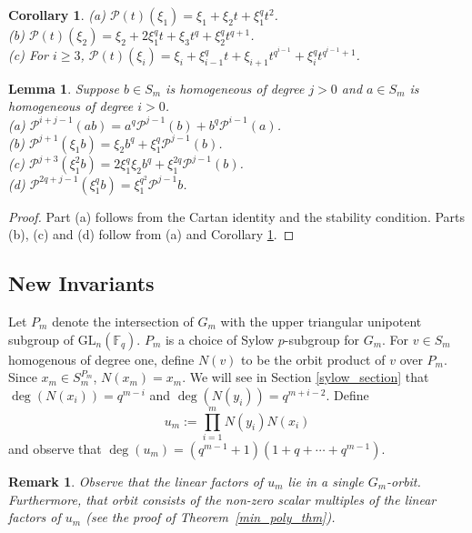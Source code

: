 \documentclass{amsart}
\newcommand{\field}{\mathbb{F}}
\newcommand{\gl}[2]{{{\text{GL}_{{#1}}(\field_{#2})}}}
\newcommand{\PP}{\mathcal{P}}
\newtheorem{lem}[subsection]{Lemma}
\newtheorem{cor}[subsection]{Corollary}
\newtheorem{remark}[subsection]{Remark}
\begin{document}
 \begin{cor} \label{com_st}(a) $\PP(t)(\xi_1)=\xi_1+\xi_2 t+\xi_1^q t^2$.\\
 (b) $\PP(t)(\xi_2)=\xi_2+2\xi_1^q t+\xi_3 t^q+\xi_2^q t^{q+1}$.\\
(c) For $i\geq 3$, 
 $\PP(t)(\xi_{i})=\xi_{i}+\xi_{i-1}^q t+\xi_{i+1} t^{q^{i-1}}+\xi_{i}^q t^{q^{i-1}+1}$.
 \end{cor}

\begin{lem} \label{sub_max} Suppose $b\in S_m$ is homogeneous of degree $j>0$ and $a\in S_m$ is homogeneous of degree $i>0$.\\
 (a) $\PP^{i+j-1}(ab)=a^q\PP^{j-1}(b)+b^q\PP^{i-1}(a)$.\\
 (b) $\PP^{j+1}(\xi_1b)=\xi_2b^q+\xi_1^q\PP^{j-1}(b)$.\\
 (c) $\PP^{j+3}(\xi_1^2b)=2\xi_1^q\xi_2b^q+\xi_1^{2q}\PP^{j-1}(b)$.\\
 (d) $\PP^{2q+j-1}(\xi_1^qb)=\xi_1^{q^2}\PP^{j-1}b$.
 \end{lem}
 
 \begin{proof} Part (a) follows from the Cartan identity and the stability condition. Parts (b), (c) and (d) follow from (a) and Corollary \ref{com_st}.
 \end{proof}




\subsection{New Invariants}
Let $P_m$ denote the intersection of $G_m$ with the upper triangular unipotent subgroup of $\gl{n}{q}$. 
$P_m$ is a choice of Sylow $p$-subgroup for $G_m$.
For $v\in S_m$ homogenous of degree one, define $N(v)$ to be the orbit product of $v$ over $P_m$. Since $x_m\in S_m^{P_m}$, $N(x_m)=x_m$.
We will see in Section \ref{sylow_section} that 
$\deg(N(x_i))=q^{m-i}$ and $\deg(N(y_i))=q^{m+i-2}$.
Define $$u_m:=\prod_{i=1}^m N(y_i)N(x_i)$$
and observe that $\deg(u_m)=(q^{m-1}+1)(1+q+\cdots +q^{m-1})$.  
\begin{remark}
Observe that the linear factors of $u_m$ lie in a single
$G_m$-orbit. Furthermore, that orbit consists of the non-zero scalar
multiples of the linear factors of $u_m$ 
(see the proof of Theorem~\ref{min_poly_thm}).
\end{remark}
\end{document}
